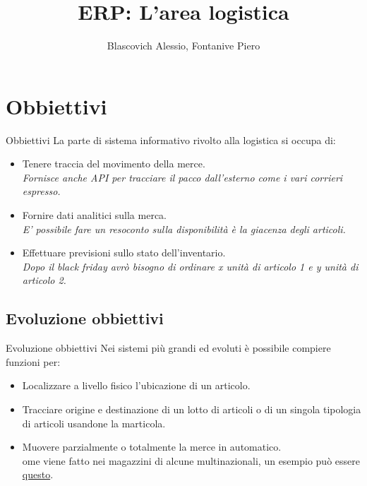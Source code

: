 \documentclass{beamer}
\title{ERP: L'area logistica}
\author{Blascovich Alessio, Fontanive Piero}
\date{}
\begin{document}
\begin{frame}
    \titlepage
\end{frame}

\section{Obbiettivi}
\begin{frame}{Obbiettivi}
    La parte di sistema informativo rivolto alla logistica si occupa di:
    \begin{itemize}
        \item Tenere traccia del movimento della merce.\\
            \textit{Fornisce anche API per tracciare il pacco dall'esterno come i vari corrieri espresso.}
        \item Fornire dati analitici sulla merca.\\
            \textit{E' possibile fare un resoconto sulla disponibilità è la giacenza degli articoli.}
        \item Effettuare previsioni sullo stato dell'inventario.\\
            \textit{Dopo il black friday avrò bisogno di ordinare x unità di articolo 1 e y unità di articolo 2.}
    \end{itemize}
\end{frame}

\subsection{Evoluzione obbiettivi}
\begin{frame}{Evoluzione obbiettivi}
    Nei sistemi più grandi ed evoluti è possibile compiere funzioni per:
    \begin{itemize}
        \item Localizzare a livello fisico l'ubicazione di un articolo.
        \item Tracciare origine e destinazione di un lotto di articoli o di un singola tipologia di articoli usandone la marticola.
        \item Muovere parzialmente o totalmente la merce in automatico.\\
            ome viene fatto nei magazzini di alcune multinazionali, un esempio può essere \href{https://www.youtube.com/watch?v=YL9XjyXsKKk}{questo}.
    \end{itemize}
\end{frame}
\end{document}
